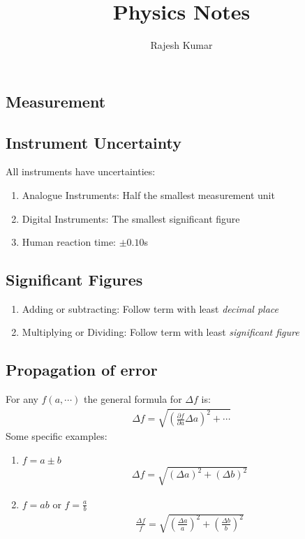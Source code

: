 \documentclass[a4paper]{article}
\title{Physics Notes}
\author{Rajesh Kumar}
\makeatletter
\renewcommand\tableofcontents{%
  \@starttoc{toc}%
}
\newcommand{\pd}[2]{
  \ensuremath{
    \frac{\partial #1}{\partial #2} }} %
\makeatother
\begin{document}
\maketitle

\begin{multicols*}{2}
  \tableofcontents
\end{multicols*}
\newpage
\begin{multicols*}{2}
\section{Measurement}
\subsection{Instrument Uncertainty}
All instruments have uncertainties:
\begin{enumerate}
\item Analogue Instruments: Half the smallest measurement unit
\item Digital Instruments: The smallest significant figure
\item Human reaction time: $\pm 0.10$s
\end{enumerate}
\subsection{Significant Figures}
\begin{enumerate}
\item Adding or subtracting: Follow term with least {\em decimal place}
\item Multiplying or Dividing: Follow term with least {\em significant figure}
\end{enumerate}
\subsection{Propagation of error}
For any $f(a, \cdots)$ the general formula for $\Delta f$ is:
\begin{align*}
  \Delta f = \sqrt{\left( \pd{f}{a} \Delta a \right)^2 + \cdots}
\end{align*}
Some specific examples:
\begin{enumerate}
\item $f=a\pm b$
  \begin{align*}
    \Delta f = \sqrt{(\Delta a)^2+(\Delta b)^2}
  \end{align*}
\item $f=ab$ or $f=\frac{a}{b}$
  \begin{align*}
    \frac{\Delta f}{f} = \sqrt{\left(\frac{\Delta a}{a}
      \right)^2+\left(\frac{\Delta b}{b} \right)^2}
  \end{align*}
\end{enumerate}

\end{multicols*}
\end{document}
